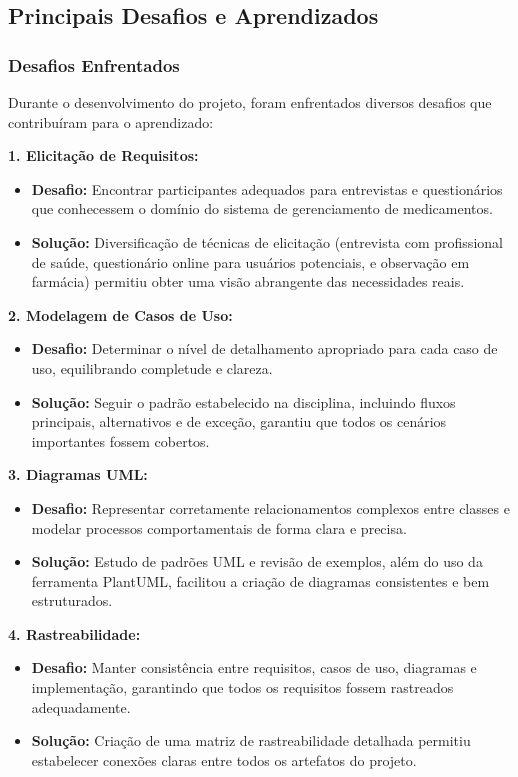 \documentclass[12pt]{article}
\begin{document}
\subsection{Principais Desafios e Aprendizados}

\subsubsection{Desafios Enfrentados}

Durante o desenvolvimento do projeto, foram enfrentados diversos desafios que contribuíram para o aprendizado:

\textbf{1. Elicitação de Requisitos:}
\begin{itemize}
    \item \textbf{Desafio:} Encontrar participantes adequados para entrevistas e questionários que conhecessem o domínio do sistema de gerenciamento de medicamentos.
    \item \textbf{Solução:} Diversificação de técnicas de elicitação (entrevista com profissional de saúde, questionário online para usuários potenciais, e observação em farmácia) permitiu obter uma visão abrangente das necessidades reais.
\end{itemize}

\textbf{2. Modelagem de Casos de Uso:}
\begin{itemize}
    \item \textbf{Desafio:} Determinar o nível de detalhamento apropriado para cada caso de uso, equilibrando completude e clareza.
    \item \textbf{Solução:} Seguir o padrão estabelecido na disciplina, incluindo fluxos principais, alternativos e de exceção, garantiu que todos os cenários importantes fossem cobertos.
\end{itemize}

\textbf{3. Diagramas UML:}
\begin{itemize}
    \item \textbf{Desafio:} Representar corretamente relacionamentos complexos entre classes e modelar processos comportamentais de forma clara e precisa.
    \item \textbf{Solução:} Estudo de padrões UML e revisão de exemplos, além do uso da ferramenta PlantUML, facilitou a criação de diagramas consistentes e bem estruturados.
\end{itemize}

\textbf{4. Rastreabilidade:}
\begin{itemize}
    \item \textbf{Desafio:} Manter consistência entre requisitos, casos de uso, diagramas e implementação, garantindo que todos os requisitos fossem rastreados adequadamente.
    \item \textbf{Solução:} Criação de uma matriz de rastreabilidade detalhada permitiu estabelecer conexões claras entre todos os artefatos do projeto.
\end{itemize}
\end{document}
